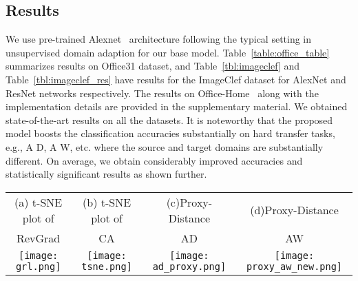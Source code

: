 \documentclass{bmvc2k}
\begin{document}
\subsection{Results}




We use pre-trained Alexnet~\cite{krizhevsky_NIPS2012} architecture following the typical setting in unsupervised domain adaption for our base model. Table~\ref{table:office_table} summarizes results on Office31 dataset,
and Table~\ref{tbl:imageclef} and Table~\ref{tbl:imageclef_res} have results for the ImageClef dataset for AlexNet and ResNet networks respectively. The results on Office-Home~\cite{venkateswara_cvpr2017deep} along with the implementation details are provided in the supplementary material. We obtained state-of-the-art results on all the datasets. It is noteworthy that the proposed model boosts the classification accuracies substantially on hard transfer tasks, e.g., A D, A W, etc. where the source and target domains are substantially different. On average, we obtain considerably improved accuracies and statistically significant results as shown further.

\begin{figure*}[!]
     \small
     \centering
     \begin{tabular}[b]{ c  c c c  }
     (a) t-SNE plot of &  (b) t-SNE plot of & (c)Proxy-Distance &  (d)Proxy-Distance    \\ RevGrad &  CA &   AD &  AW  \\ 
     \texttt{[image: grl.png]}
     & \texttt{[image: tsne.png]}
     & \texttt{[image: ad\_proxy.png]}
     & \texttt{[image: proxy\_aw\_new.png]}
       \end{tabular}
\caption{(a) and (b) figures show t-SNE visualizations of the CNN's activation (a) in case when adapted through\cite{ganin_ICML2015} and (b) when adapted through proposed model. Blue and red points correspond to the source domain(A), and the target domain (W) respectively. Sub figures (c) and (d) show the proxy distance for AD and AW.}
      \label{tbl:tSNE}


 \end{figure*}
\end{document}
